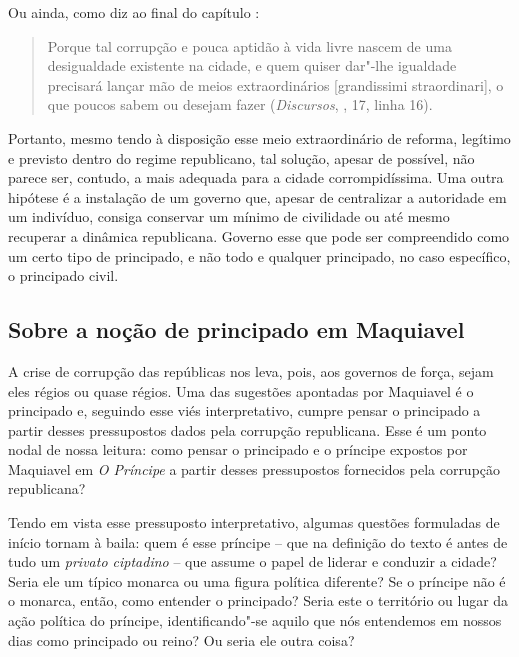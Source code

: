 Ou ainda, como diz ao final do capítulo :

\begin{quote}
Porque tal corrupção e pouca aptidão à vida livre nascem de uma
desigualdade existente na cidade, e quem quiser dar"-lhe igualdade
precisará lançar mão de meios extraordinários {[}grandissimi
straordinari{]}, o que poucos sabem ou desejam fazer (\emph{Discursos},
, 17, linha 16).
\end{quote}

Portanto, mesmo tendo à disposição esse meio extraordinário de reforma,
legítimo e previsto dentro do regime republicano, tal solução, apesar de
possível, não parece ser, contudo, a mais adequada para a cidade
corrompidíssima. Uma outra hipótese é a instalação de um governo que,
apesar de centralizar a autoridade em um indivíduo, consiga conservar um
mínimo de civilidade ou até mesmo recuperar a dinâmica republicana.
Governo esse que pode ser compreendido como um certo tipo de principado,
e não todo e qualquer principado, no caso específico, o principado
civil.

\subsection{Sobre a noção de principado em Maquiavel}

A crise de corrupção das repúblicas nos leva, pois, aos governos de
força, sejam eles régios ou quase régios. Uma das sugestões apontadas
por Maquiavel é o principado e, seguindo esse viés interpretativo,
cumpre pensar o principado a partir desses pressupostos dados pela
corrupção republicana. Esse é um ponto nodal de nossa leitura: como
pensar o principado e o príncipe expostos por Maquiavel em \emph{O
Príncipe} a partir desses pressupostos fornecidos pela corrupção
republicana?

Tendo em vista esse pressuposto interpretativo, algumas questões
formuladas de início tornam à baila: quem é esse príncipe -- que na
definição do texto é antes de tudo um \emph{privato ciptadino} -- que
assume o papel de liderar e conduzir a cidade? Seria ele um típico
monarca ou uma figura política diferente? Se o príncipe não é o monarca,
então, como entender o principado? Seria este o território ou lugar da
ação política do príncipe, identificando"-se aquilo que nós entendemos em
nossos dias como principado ou reino? Ou seria ele outra coisa?

